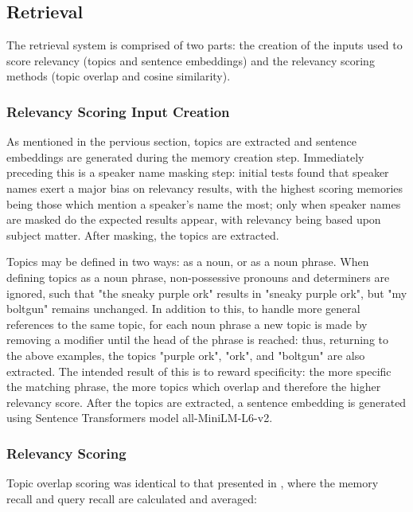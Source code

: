 
\subsection{Retrieval}

The retrieval system is comprised of two parts: the creation of the inputs used to score relevancy (topics and sentence embeddings) and the relevancy scoring methods (topic overlap and cosine similarity). 


\subsubsection{Relevancy Scoring Input Creation} 
\label{relevancy_scoring_input_creation}

As mentioned in the pervious section, topics are extracted and sentence embeddings are generated during the memory creation step. Immediately preceding this is a speaker name masking step: initial tests found that speaker names exert a major bias on relevancy results, with the highest scoring memories being those which mention a speaker's name the most; only when speaker names are masked do the expected results appear, with relevancy being based upon subject matter. After masking, the topics are extracted. 

Topics may be defined in two ways: as a noun, or as a noun phrase. When defining topics as a noun phrase, non-possessive pronouns and determiners are ignored, such that "the sneaky purple ork" results in "sneaky purple ork", but "my boltgun" remains unchanged. In addition to this, to handle more general references to the same topic, for each noun phrase a new topic is made by removing a modifier until the head of the phrase is reached: thus, returning to the above examples, the topics "purple ork", "ork", and "boltgun" are also extracted. The intended result of this is to reward specificity: the more specific the matching phrase, the more topics which overlap and therefore the higher relevancy score. After the topics are extracted, a sentence embedding is generated using Sentence Transformers model all-MiniLM-L6-v2.


\subsubsection{Relevancy Scoring}

Topic overlap scoring was identical to that presented in \cite{Li2024}, where the memory recall and query recall are calculated and averaged:

